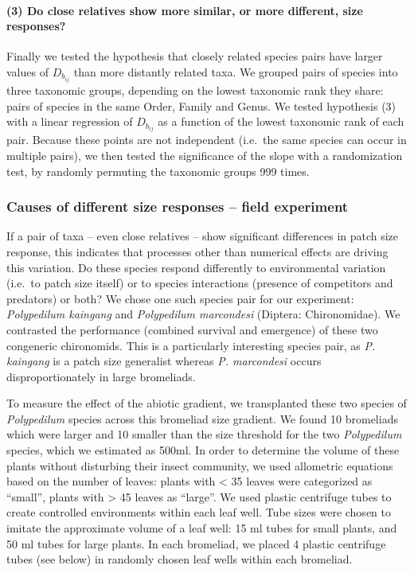 \paragraph{(3) Do close relatives show more similar, or more different,
size
responses?}\label{do-close-relatives-show-more-similar-or-more-different-size-responses}

Finally we tested the hypothesis that closely related species pairs have larger values of \(D_{b_{ij}}\) than more distantly related taxa. We grouped
pairs of species into three taxonomic groups, depending on the lowest
taxonomic rank they share: pairs of species in the same Order, Family
and Genus. We tested hypothesis (3) with a linear regression of \(D_{b_{ij}}\) as a
function of the lowest taxonomic rank of each pair. Because these points are
not independent (i.e.~the same species can occur in multiple pairs), we
then tested the significance of the slope with a
randomization test, by randomly permuting the taxonomic groups 999
times.

\subsubsection{Causes of different size responses -- field
experiment}\label{causes-of-different-size-responses-field-experiment}

If a pair of taxa -- even close relatives -- show significant
differences in patch size response, this indicates that processes other than numerical effects
are driving this variation. Do these species respond differently to
environmental variation (i.e.~to patch size itself) or to species
interactions (presence of competitors and predators) or both? We chose
one such species pair for our experiment: \emph{Polypedilum kaingang}
and \emph{Polypedilum marcondesi} (Diptera: Chironomidae). We contrasted
the performance (combined survival and emergence) of these two
congeneric chironomids. This is a particularly interesting species pair,
as \emph{P. kaingang} is a patch size generalist whereas \emph{P.
marcondesi} occurs disproportionately in large bromeliads.

To measure the effect of the abiotic gradient, we transplanted these two
species of \emph{Polypedilum} species across this bromeliad size
gradient. We found 10 bromeliads which were larger and 10 smaller than
the size threshold for the two \emph{Polypedilum} species, which we
estimated as 500ml. In order to determine the volume of these plants
without disturbing their insect community, we used allometric equations
based on the number of leaves: plants with \textless{} 35 leaves were
categorized as ``small'', plants with \textgreater{} 45 leaves as
``large''. We used plastic centrifuge tubes to create controlled
environments within each leaf well. Tube sizes were chosen to imitate
the approximate volume of a leaf well: 15 ml tubes for small plants, and
50 ml tubes for large plants. In each bromeliad, we placed 4 plastic
centrifuge tubes (see below) in randomly chosen leaf wells within each
bromeliad.

